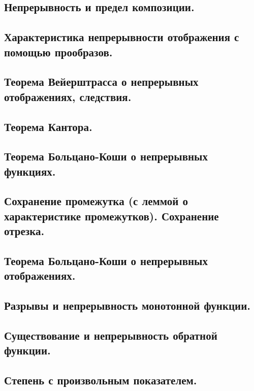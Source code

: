 \documentclass[12pt, a4paper]{article}
\begin{document}
\subsection{Непрерывность и предел композиции.}

\subsection{Характеристика непрерывности отображения с помощью прообразов.}

\subsection{Теорема Вейерштрасса о непрерывных отображениях, следствия.}

\subsection{Теорема Кантора.}

\subsection{Теорема Больцано-Коши о непрерывных функциях.}

\subsection{Сохранение промежутка (с леммой о характеристике промежутков). Сохранение отрезка.}

\subsection{Теорема Больцано-Коши о непрерывных отображениях.}

\subsection{Разрывы и непрерывность монотонной функции.}

\subsection{Существование и непрерывность обратной функции.}

\subsection{Степень с произвольным показателем.}
\end{document}
